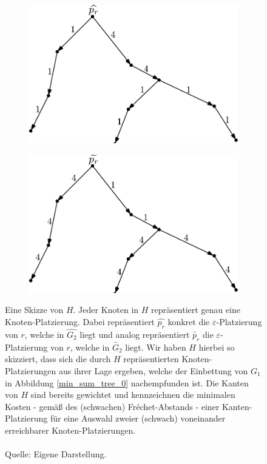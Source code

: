 \documentclass[a4paper, 12pt, twoside]{article}
\theoremstyle{Format1} %
\begin{document}
\begin{figure}[H]
	\centering
	\begin{subfigure}{.5\textwidth}
		\centering
		\includegraphics[width=\linewidth]{min_sum_tree_1.pdf}
	\end{subfigure}%
	\begin{subfigure}{.5\textwidth}
		\centering
		\includegraphics[width=\linewidth]{min_sum_tree_2.pdf}
	\end{subfigure}
	\caption{
	Eine Skizze von $H$. Jeder Knoten in $H$ repräsentiert genau eine Knoten-Platzierung.
	Dabei repräsentiert $\widehat{p_r}$ konkret die $\varepsilon$-Platzierung von $r$, welche in $\widehat{G_2}$ liegt und analog
	repräsentiert $\widetilde{p_r}$ die $\varepsilon$-Platzierung von $r$, welche in $\widetilde{G_2}$ liegt.
	Wir haben $H$ hierbei so skizziert, dass sich die durch $H$ repräsentierten Knoten-Platzierungen aus ihrer Lage ergeben, welche
	der Einbettung von $G_1$ in Abbildung \ref{min_sum_tree_0} nachempfunden ist.
	Die Kanten von $H$ sind bereits gewichtet und kennzeichnen die minimalen Kosten - gemäß des (schwachen) Fréchet-Abstands -
	einer Kanten-Platzierung für eine Auswahl zweier (schwach) voneinander erreichbarer Knoten-Platzierungen.
	\\
	\\
	Quelle: Eigene Darstellung.
	}
	\label{min_sum_tree_1}
\end{figure}
\end{document}
